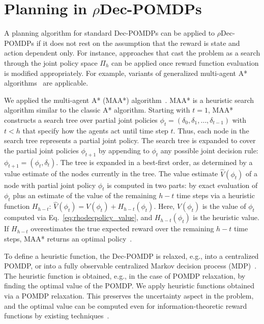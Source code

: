 \section{Planning in $\rho$Dec-POMDPs}
\label{sec:planning}
A planning algorithm for standard Dec-POMDPs can be applied to $\rho$Dec-POMDPs if it does not rest on the assumption that the reward is state and action dependent only.
For instance, approaches that cast the problem as a search through the joint policy space $\Pi_h$ can be applied once reward function evaluation is modified appropriately.
For example, variants of generalized multi-agent A* algorithms~\cite{Oliehoek2008} are applicable.

We applied the multi-agent A* (MAA*) algorithm~\cite{Szer2005}.
MAA* is a heuristic search algorithm similar to the classic A* algorithm.
Starting with $t=1$, MAA* constructs a search tree over partial joint policies $\phi_t = (\delta_0, \delta_1, \ldots, \delta_{t-1})$ with $t < h$ that specify how the agents act until time step $t$.
Thus, each node in the search tree represents a partial joint policy.
The search tree is expanded to cover the partial joint policies $\phi_{t+1}$ by appending to $\phi_t$ any possible joint decision rule: $\phi_{t+1} = (\phi_t, \delta_t)$.
The tree is expanded in a best-first order, as determined by a value estimate of the nodes currently in the tree.
The value estimate $\hat{V}(\phi_t)$ of a node with partial joint policy $\phi_t$ is computed in two parts: by exact evaluation of $\phi_t$ plus an estimate of the value of the remaining $h-t$ time steps via a heuristic function $H_{h-t}$: $\hat{V}(\phi_t) = V(\phi_t) + H_{h-t}(\phi_t)$.
Here, $V(\phi_t)$ is the value of $\phi_t$ computed via Eq.~\eqref{eq:rhodecpolicy_value}, and $H_{h-t}(\phi_t)$ is the heuristic value. %
If $H_{h-t}$ overestimates the true expected reward over the remaining $h-t$ time steps, MAA* returns an optimal policy~\cite{Szer2005}.

To define a heuristic function, the Dec-POMDP is relaxed, e.g., into a centralized POMDP, or into a fully observable centralized Markov decision process (MDP)~\cite{Oliehoek2008}.
The heuristic function is obtained, e.g., in the case of POMDP relaxation, by finding the optimal value of the POMDP.
We apply heuristic functions obtained via a POMDP relaxation.
This preserves the uncertainty aspect in the problem, and the optimal value can be computed even for information-theoretic reward functions by existing techniques~\cite{Araya2010}.